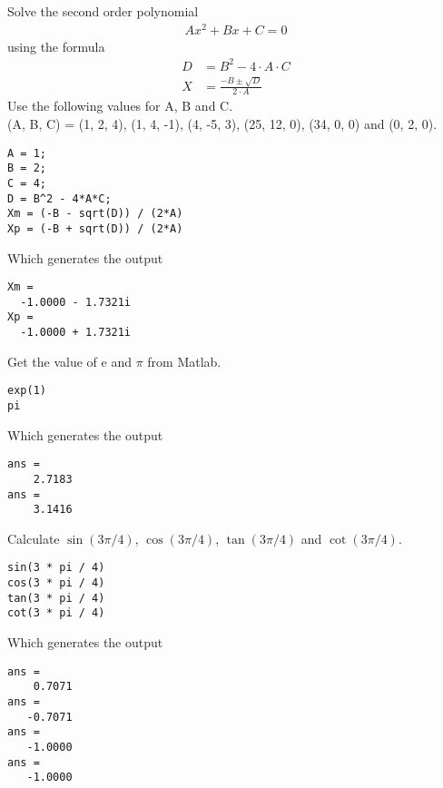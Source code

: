 \begin{ex}
Solve the second order polynomial
\begin{align}
A x^2 + B x + C = 0
\end{align}
using the formula
\begin{align}
D & = B^2 - 4 \cdot A \cdot C	\\
X & = \frac{-B\pm \sqrt{D}}{2 \cdot A}
\end{align}
Use the following values for A, B and C.\\ \noindent
(A, B, C) = (1, 2, 4), (1, 4, -1), (4, -5, 3), (25, 12, 0), (34, 0, 0) and (0, 2, 0).
\begin{sol}
\begin{lstlisting}
A = 1;
B = 2; 
C = 4;
D = B^2 - 4*A*C;
Xm = (-B - sqrt(D)) / (2*A)
Xp = (-B + sqrt(D)) / (2*A)
\end{lstlisting}
Which generates the output
\begin{lstlisting}
Xm =
  -1.0000 - 1.7321i
Xp =
  -1.0000 + 1.7321i
\end{lstlisting}
\end{sol}
\end{ex}

\begin{ex}
Get the value of e and $\pi$ from Matlab.
\begin{sol}
\begin{lstlisting}
exp(1)
pi
\end{lstlisting}
Which generates the output
\begin{lstlisting}
ans =
    2.7183
ans =
    3.1416
\end{lstlisting}
\end{sol}
\end{ex}

\begin{ex}
Calculate $\sin(3 \pi / 4)$, $\cos(3 \pi / 4)$, $\tan(3 \pi /4)$ and $\cot(3 \pi / 4)$.
\begin{sol}
\begin{lstlisting}
sin(3 * pi / 4)
cos(3 * pi / 4)
tan(3 * pi / 4)
cot(3 * pi / 4)
\end{lstlisting}
Which generates the output
\begin{lstlisting}
ans =
    0.7071
ans =
   -0.7071
ans =
   -1.0000
ans =
   -1.0000
\end{lstlisting}
\end{sol}
\end{ex}


